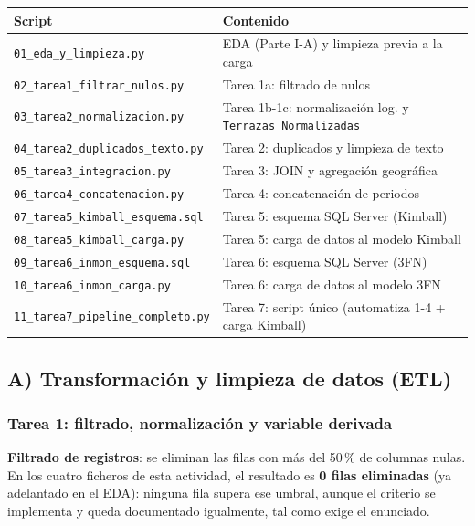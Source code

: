 \documentclass[11pt]{article}
\begin{document}
\begin{center}
\begin{tabular}{ll}
\toprule
Script & Contenido \\
\midrule
\texttt{01\_eda\_y\_limpieza.py} & EDA (Parte I-A) y limpieza previa a la carga \\
\texttt{02\_tarea1\_filtrar\_nulos.py} & Tarea 1a: filtrado de nulos \\
\texttt{03\_tarea2\_normalizacion.py} & Tarea 1b-1c: normalización log. y \texttt{Terrazas\_Normalizadas} \\
\texttt{04\_tarea2\_duplicados\_texto.py} & Tarea 2: duplicados y limpieza de texto \\
\texttt{05\_tarea3\_integracion.py} & Tarea 3: JOIN y agregación geográfica \\
\texttt{06\_tarea4\_concatenacion.py} & Tarea 4: concatenación de periodos \\
\texttt{07\_tarea5\_kimball\_esquema.sql} & Tarea 5: esquema SQL Server (Kimball) \\
\texttt{08\_tarea5\_kimball\_carga.py} & Tarea 5: carga de datos al modelo Kimball \\
\texttt{09\_tarea6\_inmon\_esquema.sql} & Tarea 6: esquema SQL Server (3FN) \\
\texttt{10\_tarea6\_inmon\_carga.py} & Tarea 6: carga de datos al modelo 3FN \\
\texttt{11\_tarea7\_pipeline\_completo.py} & Tarea 7: script único (automatiza 1-4 + carga Kimball) \\
\bottomrule
\end{tabular}
\label{tab:scripts}
\end{center}

\subsection{A) Transformación y limpieza de datos (ETL)}
\label{ssec:tarea1}

\subsubsection{Tarea 1: filtrado, normalización y variable derivada}

\textbf{Filtrado de registros}: se eliminan las filas con más del 50\,\% de columnas
nulas. En los cuatro ficheros de esta actividad, el resultado es \textbf{0 filas
eliminadas} (ya adelantado en el EDA): ninguna fila supera ese umbral, aunque el criterio
se implementa y queda documentado igualmente, tal como exige el enunciado.
\end{document}
